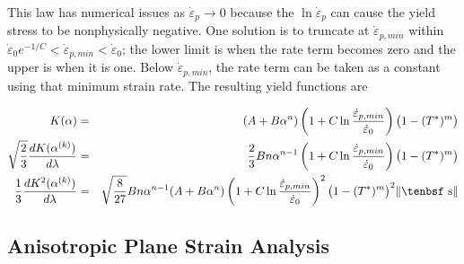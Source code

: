 \documentclass[11pt]{article}
\def\dev{\hbox{\tenbsf s}}
\begin{document}
\noindent This law has numerical issues as $\dot{\varepsilon}_p\to 0$ because the $\ln \dot{\varepsilon}_p$ can cause the yield stress to be nonphysically negative. One solution is to truncate at $\dot{\varepsilon}_{p,min}$ within $\dot{\varepsilon}_0 e^{-1/C} < \dot{\varepsilon}_{p,min} < \dot{\varepsilon}_0$; the lower limit is when the rate term becomes zero and the upper is when it is one. Below $\dot{\varepsilon}_{p,min}$, the rate term can be taken as a constant using that minimum strain rate. The resulting yield functions are

\begin{eqnarray}
   K(\alpha) & = &  (A+B\alpha^n)\left(1+C\ln{\dot{\varepsilon}_{p,min}\over \dot{\varepsilon}_0}\right)\bigl(1-(T^*)^m\bigr) \\
   \sqrt{2\over3}{dK(\alpha^{(k)})\over d\lambda} & = &  {2\over 3} B n \alpha^{n-1}\left(1+C\ln{\dot{\varepsilon}_{p,min}\over \dot{\varepsilon}_0}\right)
                   \bigl(1-(T^*)^m\bigr)\\
   {1\over3}{dK^2(\alpha^{(k)})\over d\lambda} & = & \sqrt{8\over27}B n \alpha^{n-1}(A+B\alpha^n)\left(1+C\ln{\dot{\varepsilon}_{p,min}\over \dot{\varepsilon}_0}\right)^2
                   \bigl(1-(T^*)^m\bigr)^2   \|\dev\|
\end{eqnarray}

\subsection{Anisotropic Plane Strain Analysis}
\end{document}
